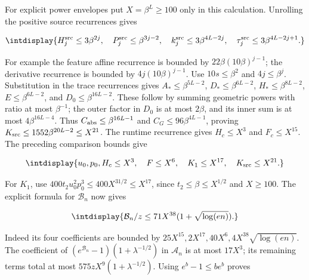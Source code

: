 
For explicit power envelopes put \(X=\beta^L\ge100\) only in this calculation. Unrolling the positive source recurrences gives


\begingroup\renewcommand{\theHequation}{intdisplay.620}
\begin{equation*}
\intdisplay{
H_j^{\rm src}\le3\beta^{2j},\quad
P_j^{\rm src}\le\beta^{3j-2},\quad
k_j^{\rm src}\le3\beta^{4L-2j},\quad
\tau_j^{\rm src}\le3\beta^{4L-2j+1}.
}
\end{equation*}
\endgroup


For example the feature affine recurrence is bounded by \(22\beta(10\beta)^{j-1}\); the derivative recurrence is bounded by \(4j(10\beta)^{j-1}\). Use \(10s\le\beta^2\) and \(4j\le\beta^j\). Substitution in the trace recurrences gives \(A_*\le\beta^{5L-2}\), \(D_*\le\beta^{6L-2}\), \(H_*\le\beta^{8L-2}\), \(E\le\beta^{6L-2}\), and \(D_0\le\beta^{16L-2}\). These follow by summing geometric powers with ratio at most \(\beta^{-1}\); the outer factor in \(D_0\) is at most \(2\beta\), and its inner sum is at most \(4\beta^{16L-4}\). Thus \(C_{\rm abs}\le\beta^{16L-1}\) and \(C_G\le96\beta^{4L-1}\), proving \(K_{\rm src}\le1552\beta^{20L-2}\le X^{21}\). The runtime recurrence gives \(H_c\le X^3\) and \(F_c\le X^{15}\). The preceding comparison bounds give


\begingroup\renewcommand{\theHequation}{intdisplay.621}
\begin{equation*}
\intdisplay{
u_0,p_0,H_c\le X^3,\quad F\le X^6,\quad
K_1\le X^{17},\quad K_{\rm src}\le X^{21}.
}
\end{equation*}
\endgroup


For \(K_1\), use \(400t_2u_0^2p_0^3\le400X^{31/2}\le X^{17}\), since \(t_2\le\beta\le X^{1/2}\) and \(X\ge100\). The explicit formula for \(\mathcal B_n\) now gives


\begingroup\renewcommand{\theHequation}{intdisplay.622}
\begin{equation*}
\intdisplay{
\mathcal B_n/z\le71X^{38}(1+\sqrt{\log(en)}).
}
\end{equation*}
\endgroup


Indeed its four coefficients are bounded by \(25X^{15},\allowbreak 2X^{17},\allowbreak 40X^6,\allowbreak 4X^{38}\sqrt{\log(en)}\). The coefficient of \((e^{\mathcal B_n}-1)(1+\lambda^{-1/2})\) in \(\mathcal A_n\) is at most \(17X^3\); its remaining terms total at most \(575zX^9(1+\lambda^{-1/2})\). Using \(e^b-1\le be^b\) proves



